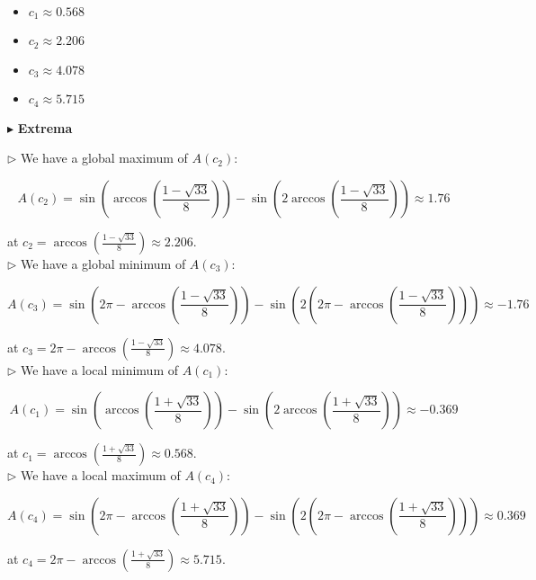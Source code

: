 \documentclass{ximera}
\begin{document}
\begin{center}
\end{center}




\begin{itemize}
  \item $c_1 \approx 0.568$
  \item $c_2 \approx 2.206$
  \item $c_3 \approx 4.078$
  \item $c_4 \approx 5.715$
\end{itemize}







$\blacktriangleright$ \textbf{Extrema}




$\rhd$ We have a global maximum of $A(c_2)$:


\[  A(c_2) = \sin\left(\arccos\left(\frac{1 - \sqrt{33}}{8}\right)\right) - \sin\left(2 \arccos\left(\frac{1 - \sqrt{33}}{8}\right)\right) \approx 1.76   \]




at $c_2 = \arccos\left(\frac{1 - \sqrt{33}}{8}\right) \approx 2.206$. \\









$\rhd$ We have a global minimum of $A(c_3)$:


\[  A(c_3) = \sin\left(   2\pi - \arccos\left(\frac{1 - \sqrt{33}}{8}\right)    \right) - \sin\left(2  \left(     2\pi - \arccos\left(\frac{1 - \sqrt{33}}{8}\right)     \right) \right)  \approx -1.76  \]




at $c_3 = 2\pi - \arccos\left(\frac{1 - \sqrt{33}}{8}\right) \approx 4.078$. \\








$\rhd$ We have a local minimum of $A(c_1)$:


\[  A(c_1) = \sin\left(   \arccos\left(\frac{1 + \sqrt{33}}{8}\right)    \right) - \sin\left(2  \arccos\left(\frac{1 + \sqrt{33}}{8}\right)   \right)  \approx -0.369  \]




at $c_1 = \arccos\left(\frac{1 + \sqrt{33}}{8}\right) \approx 0.568$.   \\












$\rhd$ We have a local maximum of $A(c_4)$:


\[  A(c_4) = \sin\left(   2\pi - \arccos\left(\frac{1 + \sqrt{33}}{8}\right)   \right) - \sin\left(2  (2\pi - \arccos\left(\frac{1 + \sqrt{33}}{8}\right))  \right)  \approx 0.369  \]




at $c_4 = 2\pi - \arccos\left(\frac{1 + \sqrt{33}}{8}\right) \approx 5.715$.   \\
\end{document}
